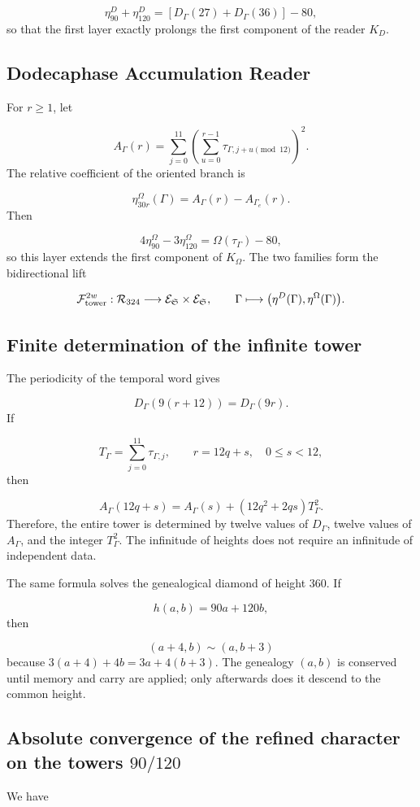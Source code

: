 \[
 \eta_{90}^{D}+\eta_{120}^{D}
 =[D_\Gamma(27)+D_\Gamma(36)]-80,
\]
so that the first layer exactly prolongs the first component of the reader \(K_D\).

\subsection{Dodecaphase Accumulation Reader}
For \(r\ge1\), let

\[
 A_\Gamma(r)=
 \sum_{j=0}^{11}
 \left(
 \sum_{u=0}^{r-1}
 \tau_{\Gamma,j+u\!\!\!\pmod{12}}
 \right)^2.
\]
The relative coefficient of the oriented branch is

\[
 \boxed{\eta_{30r}^{\Omega}(\Gamma)
 =A_\Gamma(r)-A_{\Gamma_e}(r).}
\]
Then

\[
 4\eta_{90}^{\Omega}-3\eta_{120}^{\Omega}
 =\Omega(\tau_\Gamma)-80,
\]
so this layer extends the first component of \(K_\Omega\). The two families form the bidirectional lift

\[
 \mathcal F_{\rm tower}^{2w}:
 \mathcal R_{324}\longrightarrow
 \mathcal E_{\mathfrak S}\times\mathcal E_{\mathfrak S},
 \qquad
 \Gamma\longmapsto
 \bigl(\eta^D(\Gamma),\eta^\Omega(\Gamma)\bigr).
\]
\subsection{Finite determination of the infinite tower}
The periodicity of the temporal word gives

\[
 D_\Gamma(9(r+12))=D_\Gamma(9r).
\]
If

\[
 T_\Gamma=\sum_{j=0}^{11}\tau_{\Gamma,j},
 \qquad r=12q+s,\quad 0\le s<12,
\]
then

\[
 A_\Gamma(12q+s)
 =A_\Gamma(s)+(12q^2+2qs)T_\Gamma^2.
\]
Therefore, the entire tower is determined by twelve values of \(D_\Gamma\), twelve values of \(A_\Gamma\), and the integer \(T_\Gamma^2\). The infinitude of heights does not require an infinitude of independent data.

The same formula solves the genealogical diamond of height 360. If

\[
 h(a,b)=90a+120b,
\]
then

\[
 (a+4,b)\sim(a,b+3)
\]
because \(3(a+4)+4b=3a+4(b+3)\). The genealogy \((a,b)\) is conserved until memory and carry are applied; only afterwards does it descend to the common height.

\subsection{Absolute convergence of the refined character on the towers \(90/120\)}
We have

